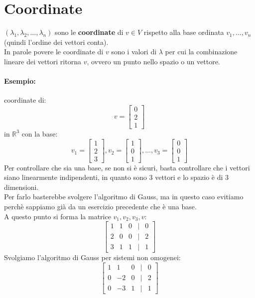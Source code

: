 \documentclass[12pt,a4paper]{article}
\let\oldsection\section
\renewcommand{\section}{\clearpage\oldsection}
\begin{document}
\section{Coordinate}
$(\lambda_1,\lambda_2,\ldots,\lambda_n)$ sono le \textbf{coordinate} di $v \in V$ rispetto alla base ordinata $v_1,\ldots,v_n$ (quindi l'ordine dei vettori conta).\\
In parole povere le coordinate di $v$ sono i valori di $\lambda$ per cui la combinazione lineare dei vettori ritorna $v$, ovvero un punto nello spazio o un vettore.\\
\paragraph{Esempio:} coordinate di: 
\[v = \begin{bmatrix}
  0\\
  2\\
  1
\end{bmatrix}\]
in $\mathbb{R}^3$ con la base:
\[
v_1 = \begin{bmatrix}
  1\\
  2\\
  3
\end{bmatrix}, v_2 = \begin{bmatrix}
  1\\
  0\\
  1
\end{bmatrix}, \ldots, v_3 = \begin{bmatrix}
  0\\
  0\\
  1
\end{bmatrix}
\]
Per controllare che sia una base, se non si è sicuri, basta controllare che i vettori siano linearmente indipendenti, in quanto sono 3 vettori e lo spazio è di 3 dimensioni.\\
Per farlo basterebbe svolgere l'algoritmo di Gauss, ma in questo caso evitiamo perchè sappiamo già da un esercizio precedente che è una base.\\
A questo punto si forma la matrice $v_1,v_2,v_3,v$:
\[
\begin{bmatrix}
  1 & 1 & 0 & | & 0\\
  2 & 0 & 0 & | & 2\\
  3 & 1 & 1 & | & 1
\end{bmatrix}
\]
Svolgiamo l'algoritmo di Gauss per sistemi non omogenei:
\[
\begin{bmatrix}
  1 & 1 & 0 & | & 0\\
  0 & -2 & 0 & | & 2\\
  0 & -3 & 1 & | & 1
\end{bmatrix}
\]
\end{document}
